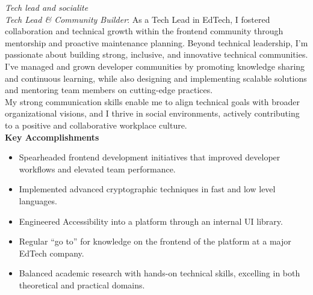 \documentclass[9pt]{developercv} %
\begin{document}

\vspace{-5px}
\textcolor{BurntOrange}{\textit{Tech lead and socialite}}\\

\textit{Tech Lead \& Community Builder}: As a Tech Lead in EdTech, I fostered collaboration and technical growth within the frontend community through mentorship and proactive maintenance planning. Beyond technical leadership, I'm passionate about building strong, inclusive, and innovative technical communities. I've managed and grown developer communities by promoting knowledge sharing and continuous learning, while also designing and implementing scalable solutions and mentoring team members on cutting-edge practices.\\

My strong communication skills enable me to align technical goals with broader organizational visions, and I thrive in social environments, actively contributing to a positive and collaborative workplace culture.\\

\textbf{Key Accomplishments}\\

\begin{itemize}
	\item Spearheaded frontend development initiatives that improved developer workflows and elevated team performance.
	\item Implemented advanced cryptographic techniques in fast and low level languages.
	\item Engineered Accessibility into a platform through an internal UI library.
	\item Regular “go to” for knowledge on the frontend of the platform at a major EdTech company.
	\item Balanced academic research with hands-on technical skills, excelling in both theoretical and practical domains.
\end{itemize}




\end{document}
